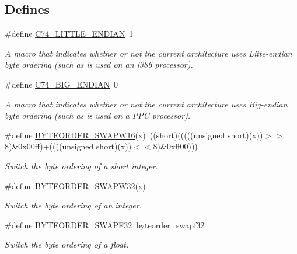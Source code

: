\subsection*{Defines}
\begin{DoxyCompactItemize}
\item 
\#define \hyperlink{group__byteorder_gaa1bcf3a033a866ca81d51e9f65ec4d3a}{C74\_\-LITTLE\_\-ENDIAN}~1
\begin{DoxyCompactList}\small\item\em A macro that indicates whether or not the current architecture uses Litte-\/endian byte ordering (such as is used on an i386 processor). \item\end{DoxyCompactList}\item 
\#define \hyperlink{group__byteorder_ga51aafb747c672a9623c9b6e851c5cb53}{C74\_\-BIG\_\-ENDIAN}~0
\begin{DoxyCompactList}\small\item\em A macro that indicates whether or not the current architecture uses Big-\/endian byte ordering (such as is used on a PPC processor). \item\end{DoxyCompactList}\item 
\#define \hyperlink{group__byteorder_ga035b5999ffd460b028adbddc114bc1ea}{BYTEORDER\_\-SWAPW16}(x)~((short)(((((unsigned short)(x))$>$$>$8)\&0x00ff)+((((unsigned short)(x))$<$$<$8)\&0xff00)))
\begin{DoxyCompactList}\small\item\em Switch the byte ordering of a short integer. \item\end{DoxyCompactList}\item 
\#define \hyperlink{group__byteorder_ga2361fba0c30f763e8fe3fb2fe0eece43}{BYTEORDER\_\-SWAPW32}(x)
\begin{DoxyCompactList}\small\item\em Switch the byte ordering of an integer. \item\end{DoxyCompactList}\item 
\#define \hyperlink{group__byteorder_ga78c51e5ecacde07ac8f68c1dc7bca801}{BYTEORDER\_\-SWAPF32}~byteorder\_\-swapf32
\begin{DoxyCompactList}\small\item\em Switch the byte ordering of a float. \item\end{DoxyCompactList}\item 

\end{DoxyCompactItemize}
